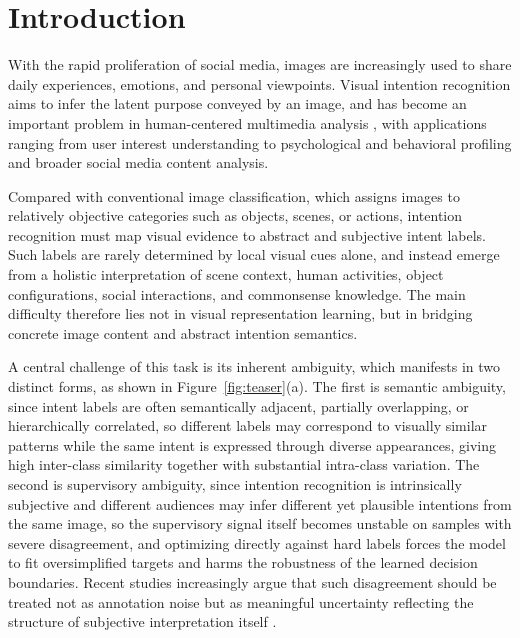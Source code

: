 \section{Introduction}
\label{sec:intro}

With the rapid proliferation of social media, images are increasingly used to share daily experiences, emotions, and personal viewpoints. Visual intention recognition aims to infer the latent purpose conveyed by an image, and has become an important problem in human-centered multimedia analysis \cite{jia_intentonomy_2021, wen_dip_2023}, with applications ranging from user interest understanding to psychological and behavioral profiling and broader social media content analysis.

Compared with conventional image classification, which assigns images to relatively objective categories such as objects, scenes, or actions, intention recognition must map visual evidence to abstract and subjective intent labels. Such labels are rarely determined by local visual cues alone, and instead emerge from a holistic interpretation of scene context, human activities, object configurations, social interactions, and commonsense knowledge. The main difficulty therefore lies not in visual representation learning, but in bridging concrete image content and abstract intention semantics.

A central challenge of this task is its inherent ambiguity, which manifests in two distinct forms, as shown in Figure~\ref{fig:teaser}(a). The first is semantic ambiguity, since intent labels are often semantically adjacent, partially overlapping, or hierarchically correlated, so different labels may correspond to visually similar patterns while the same intent is expressed through diverse appearances, giving high inter-class similarity together with substantial intra-class variation. The second is supervisory ambiguity, since intention recognition is intrinsically subjective and different audiences may infer different yet plausible intentions from the same image, so the supervisory signal itself becomes unstable on samples with severe disagreement, and optimizing directly against hard labels forces the model to fit oversimplified targets and harms the robustness of the learned decision boundaries. Recent studies increasingly argue that such disagreement should be treated not as annotation noise but as meaningful uncertainty reflecting the structure of subjective interpretation itself \cite{peterson_human_2019, mostafazadeh_davani_dealing_2022}.

